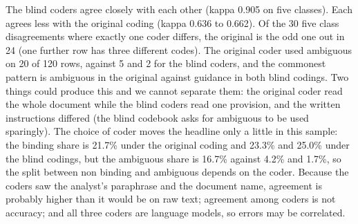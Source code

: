 \documentclass[conference]{IEEEtran}
\begin{document}
\begin{table}[t]\centering\small
{}
\caption{Agreement (percent / kappa) between the original coding and two blind coders (B2, B3), and alpha over the three.}\label{tab:ag}
\end{table}

The blind coders agree closely with each other (kappa 0.905 on five classes). Each agrees less with the original coding (kappa 0.636 to 0.662). Of the 30 five class disagreements where exactly one coder differs, the original is the odd one out in 24 (one further row has three different codes). The original coder used ambiguous on 20 of 120 rows, against 5 and 2 for the blind coders, and the commonest pattern is ambiguous in the original against guidance in both blind codings. Two things could produce this and we cannot separate them: the original coder read the whole document while the blind coders read one provision, and the written instructions differed (the blind codebook asks for ambiguous to be used sparingly). The choice of coder moves the headline only a little in this sample: the binding share is 21.7\% under the original coding and 23.3\% and 25.0\% under the blind codings, but the ambiguous share is 16.7\% against 4.2\% and 1.7\%, so the split between non binding and ambiguous depends on the coder. Because the coders saw the analyst's paraphrase and the document name, agreement is probably higher than it would be on raw text; agreement among coders is not accuracy; and all three coders are language models, so errors may be correlated. 
\end{document}
